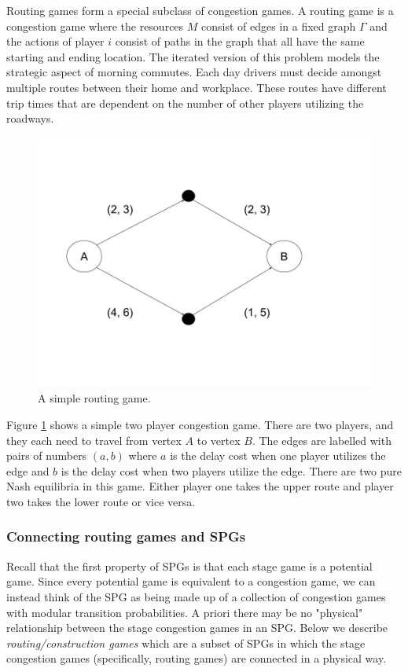 Routing games form a special subclass of congestion games. A routing game is a congestion game where the resources $M$ consist of edges in a fixed graph $\Gamma$ and the actions of player $i$ consist of paths in the graph that all have the same starting and ending location. The iterated version of this problem models the strategic aspect of morning commutes. Each day drivers must decide amongst multiple routes between their home and workplace. These routes have different trip times that are dependent on the number of other players utilizing the roadways.

\begin{example}

\begin{figure}
\includegraphics[scale=0.2]{images/simple_congestion_game.jpg}
\caption{A simple routing game.}
\label{fig:cong}
\end{figure}

Figure \ref{fig:cong} shows a simple two player congestion game. There are two players, and they each need to travel from vertex $A$ to vertex $B$. The edges are labelled with pairs of numbers $\left(a, b\right)$ where $a$ is the delay cost when one player utilizes the edge and $b$ is the delay cost when two players utilize the edge. There are two pure Nash equilibria in this game. Either player one takes the upper route and player two takes the lower route or vice versa. 
\end{example}


\subsubsection{Connecting routing games and SPGs} Recall that the first property of SPGs is that each stage game is a potential game. Since every potential game is equivalent to a congestion game, we can instead think of the SPG as being made up of a collection of congestion games with modular transition probabilities. A priori there may be no "physical" relationship between the stage congestion games in an SPG. Below we describe {\em routing/construction games} which are a subset of SPGs in which the stage congestion games (specifically, routing games) are connected in a physical way.

